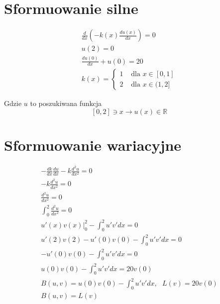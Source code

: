 \documentclass{article}
\begin{document}
\section{Sformuowanie silne}
$$
\begin{gathered}
    \frac{d}{d x}\left(-k(x) \frac{d u(x)}{d x}\right)=0 \\
    u(2)=0 \\
    \frac{d u(0)}{d x}+u(0)=20 \\
k(x)= \begin{cases}1 & \text { dla } x \in[0,1] \\
    2 & \text { dla } x \in(1,2]\end{cases}
\end{gathered}
$$

Gdzie $u$ to poszukiwana funkcja
$$
[0,2] \ni x \rightarrow u(x) \in \mathbb{R}
$$

\section{Sformuowanie wariacyjne}
$$
\begin{gathered}
-\frac{dk}{dx}\frac{du}{dx} - k\frac{d^2u}{dx^2} = 0\\
- k\frac{d^2u}{dx^2} = 0\\
\frac{d^2u}{dx^2} = 0\\
\int_0^2\frac{d^2u}{dx^2} = 0\\
u'(x)v(x)\big\rvert^2_0 - \int_0^2u'v'dx = 0\\
u'(2)v(2) - u'(0)v(0) - \int_0^2u'v'dx = 0\\
- u'(0)v(0) - \int_0^2u'v'dx = 0\\
u(0)v(0) - \int_0^2u'v'dx = 20v(0)\\
B(u,v ) = u(0)v(0) - \int_0^2u'v'dx, \text{ } L(v) = 20v(0)\\
B(u, v) = L(v)\\
\end{gathered}
$$
\end{document}
